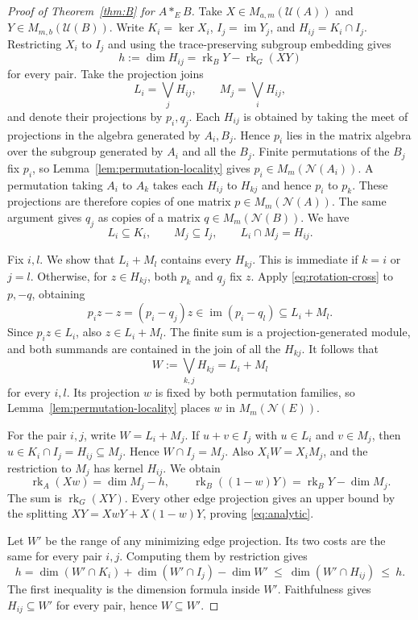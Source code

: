 \documentclass[11pt,a4paper,reqno]{amsart}
\numberwithin{equation}{section}
\theoremstyle{remark}
\newcommand{\N}{\mathcal N}
\newcommand{\U}{\mathcal U}
\newcommand{\rk}{\operatorname{rk}}
\newcommand{\im}{\operatorname{im}}
\begin{document}
\begin{proof}[Proof of Theorem~\ref{thm:B} for \(A*_E B\)]
Take \(X\in M_{a,m}(\U(A))\) and \(Y\in M_{m,b}(\U(B))\). Write \(K_i=\ker X_i\), \(I_j=\im Y_j\), and \(H_{ij}=K_i\cap I_j\). Restricting \(X_i\) to \(I_j\) and using the trace-preserving subgroup embedding gives
\[
 h:=\dim H_{ij}=\rk_B Y-\rk_G(XY)
\]
for every pair. Take the projection joins
\[
  L_i=\bigvee_j H_{ij},\qquad M_j=\bigvee_i H_{ij},
\]
and denote their projections by \(p_i,q_j\). Each \(H_{ij}\) is obtained by taking the meet of projections in the algebra generated by \(A_i,B_j\). Hence \(p_i\) lies in the matrix algebra over the subgroup generated by \(A_i\) and all the \(B_j\). Finite permutations of the \(B_j\) fix \(p_i\), so Lemma~\ref{lem:permutation-locality} gives \(p_i\in M_m(\N(A_i))\). A permutation taking \(A_i\) to \(A_k\) takes each \(H_{ij}\) to \(H_{kj}\) and hence \(p_i\) to \(p_k\). These projections are therefore copies of one matrix \(p\in M_m(\N(A))\). The same argument gives \(q_j\) as copies of a matrix \(q\in M_m(\N(B))\). We have
\[
 L_i\subseteq K_i,\qquad M_j\subseteq I_j,\qquad L_i\cap M_j=H_{ij}.
\]

Fix \(i,l\). We show that \(L_i+M_l\) contains every \(H_{kj}\). This is immediate if \(k=i\) or \(j=l\). Otherwise, for \(z\in H_{kj}\), both \(p_k\) and \(q_j\) fix \(z\). Apply \eqref{eq:rotation-cross} to \(p,-q\), obtaining
\[
 p_i z-z=(p_i-q_j)z\in\im(p_i-q_l)\subseteq L_i+M_l.
\]
Since \(p_i z\in L_i\), also \(z\in L_i+M_l\). The finite sum is a projection-generated module, and both summands are contained in the join of all the \(H_{kj}\). It follows that
\[
 W:=\bigvee_{k,j}H_{kj}=L_i+M_l
\]
for every \(i,l\). Its projection \(w\) is fixed by both permutation families, so Lemma~\ref{lem:permutation-locality} places \(w\) in \(M_m(\N(E))\).

For the pair \(i,j\), write \(W=L_i+M_j\). If \(u+v\in I_j\) with \(u\in L_i\) and \(v\in M_j\), then \(u\in K_i\cap I_j=H_{ij}\subseteq M_j\). Hence \(W\cap I_j=M_j\). Also \(X_iW=X_iM_j\), and the restriction to \(M_j\) has kernel \(H_{ij}\). We obtain
\[
 \rk_A(Xw)=\dim M_j-h,\qquad
 \rk_B((1-w)Y)=\rk_B Y-\dim M_j.
\]
The sum is \(\rk_G(XY)\). Every other edge projection gives an upper bound by the splitting \(XY=XwY+X(1-w)Y\), proving \eqref{eq:analytic}.

Let \(W'\) be the range of any minimizing edge projection. Its two costs are the same for every pair \(i,j\). Computing them by restriction gives
\[
 h=\dim(W'\cap K_i)+\dim(W'\cap I_j)-\dim W'
   \ \le\ \dim(W'\cap H_{ij})\ \le\ h .
\]
The first inequality is the dimension formula inside \(W'\). Faithfulness gives \(H_{ij}\subseteq W'\) for every pair, hence \(W\subseteq W'\).


\end{proof}
\end{document}
